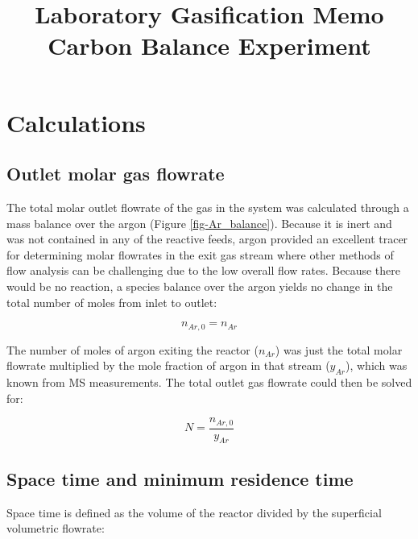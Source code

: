 \documentclass[11pt,twocolumn]{article}
\date{}
\title{Laboratory Gasification Memo\\Carbon Balance Experiment \vspace{-6ex}}
\begin{document}
\twocolumn[
  \begin{@twocolumnfalse}
    \maketitle
    \begin{abstract}
    


    \end{abstract}
  \end{@twocolumnfalse}
]

\section*{Calculations}

\subsection*{Outlet molar gas flowrate}

The total molar outlet flowrate of the gas in the system was calculated through a mass balance over the argon (Figure \ref{fig-Ar_balance}).  Because it is inert and was not contained in any of the reactive feeds, argon provided an excellent tracer for determining molar flowrates in the exit gas stream where other methods of flow analysis can be challenging due to the low overall flow rates.  Because there would be no reaction, a species balance over the argon yields no change in the total number of moles from inlet to outlet:

\begin{equation}
	n_{Ar,0} = n_{Ar}
\end{equation}

The number of moles of argon exiting the reactor ($n_{Ar}$) was just the total molar flowrate multiplied by the mole fraction of argon in that stream ($y_{Ar}$), which was known from MS measurements.  The total outlet gas flowrate could then be solved for:

\begin{equation}
	N = \frac{n_{Ar,0}}{y_{Ar}}
\end{equation}

\subsection*{Space time and minimum residence time}
Space time is defined as the volume of the reactor divided by the superficial volumetric flowrate:
\end{document}
